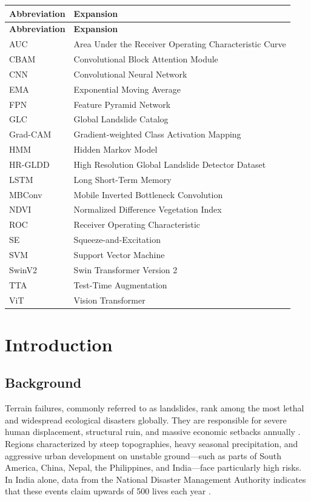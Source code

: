 \documentclass[12pt,a4paper]{report}
\begin{document}
\begin{longtable}{@{}p{3.5cm}p{10cm}@{}}
\hline
\textbf{Abbreviation} & \textbf{Expansion} \\
\hline
\endfirsthead
\hline
\textbf{Abbreviation} & \textbf{Expansion} \\
\hline
\endhead
AUC & Area Under the Receiver Operating Characteristic Curve \\
CBAM & Convolutional Block Attention Module \\
CNN & Convolutional Neural Network \\
EMA & Exponential Moving Average \\
FPN & Feature Pyramid Network \\
GLC & Global Landslide Catalog \\
Grad-CAM & Gradient-weighted Class Activation Mapping \\
HMM & Hidden Markov Model \\
HR-GLDD & High Resolution Global Landslide Detector Dataset \\
LSTM & Long Short-Term Memory \\
MBConv & Mobile Inverted Bottleneck Convolution \\
NDVI & Normalized Difference Vegetation Index \\
ROC & Receiver Operating Characteristic \\
SE & Squeeze-and-Excitation \\
SVM & Support Vector Machine \\
SwinV2 & Swin Transformer Version 2 \\
TTA & Test-Time Augmentation \\
ViT & Vision Transformer \\
\hline
\end{longtable}

\newpage
{}
\setcounter{page}{1}

\chapter{Introduction}\label{intro}

\section{Background}
Terrain failures, commonly referred to as landslides, rank among the most lethal and widespread ecological disasters globally. They are responsible for severe human displacement, structural ruin, and massive economic setbacks annually \cite{froude2018landslide}. Regions characterized by steep topographies, heavy seasonal precipitation, and aggressive urban development on unstable ground—such as parts of South America, China, Nepal, the Philippines, and India—face particularly high risks. In India alone, data from the National Disaster Management Authority indicates that these events claim upwards of 500 lives each year \cite{ndma_india}.
\end{document}
